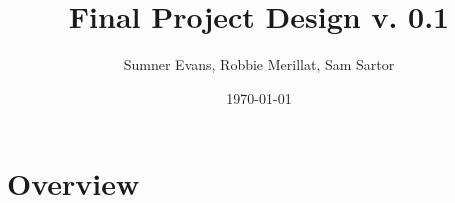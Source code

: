 \documentclass[titlepage,12pt]{article}
\title{Final Project Design v. 0.1}
\author{Sumner Evans, Robbie Merillat, Sam Sartor}
\date{\today}
\begin{document}
\maketitle

\section{Overview}
\end{document}
